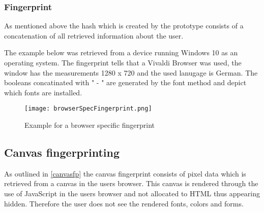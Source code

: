 \subsubsection{Fingerprint}
As mentioned above the hash which is created by the prototype consists of a concatenation of all retrieved information about the user.

The example below was retrieved from a device running Windows 10 as an operating system. The fingerprint tells that a Vivaldi Browser was used, the window has the measurements 1280 x 720 and the used lanugage is German. The booleans concatinated with " - " are generated by the font method and depict which fonts are installed.
\begin{figure}[H]
	\centering
	\texttt{[image: browserSpecFingerprint.png]}
	\caption{Example for a browser specific fingerprint\\}
	\label{fig:specFP}
\end{figure}

\subsection{Canvas fingerprinting} \label{sec:codeCanvas}

As outlined in \autoref{canvasfp} the canvas fingerprint consists of pixel data which is retrieved from a canvas in the users browser. This canvas is rendered through the use of JavaScript in the users browser and not allocated to HTML thus appearing hidden. Therefore the user does not see the rendered fonts, colors and forms.\\

